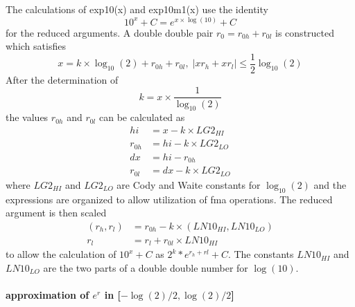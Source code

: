 \documentclass[10pt,a4paper,final,oneside]{article}
\numberwithin{equation}{subsection}
\begin{document}
The calculations of exp10(x) and exp10m1(x) use the
identity
\begin{equation}
  10^x + C = e^{x \times \log{(10)}} + C
\end{equation}
for the reduced arguments. A  double double pair $ r_0= r_{0h} + r_{0l} $ is constructed which satisfies
\begin{equation}
  x = k \times \log_{10}{(2)} + r_{0h} + r_{0l}, \;
  |xr_h +xr_l| \le \frac{1}{2} \log_{10}{(2)}
\end{equation}
After the determination of
\[
k = x \times \frac{1}{\log_{10}{(2)}}
\]
the values $r_{0h}$ and $r_{0l}$ can be calculated as
\[
\begin{aligned}
  hi &= x - k \times LG2_{HI} \\
  r_{0h} &= hi - k \times LG2_{LO} \\
  dx & = hi - r_{0h} \\
  r_{0l} &= dx - k \times LG2_{LO}
\end{aligned}
\]
where $LG2_{HI}$ and $LG2_{LO}$ are Cody and Waite constants for
$\log_{10}{(2)}$
and the expressions are organized to allow utilization of fma operations.
The reduced argument is then scaled
\[
\begin{aligned}
  (r_h, r_l) &= r_{0h} - k \times (LN10_{HI}, LN10_{LO}) \\
  r_l &= r_l + r_{0l} \times LN10_{HI}
\end{aligned}
\]
to allow the calculation of $ 10^x + C $ as $ 2^k * e^{r_h+ rl} + C$.
The constants $LN10_{HI}$ and $LN10_{LO}$ are the two parts of a
double double number for $\log(10)$.


\paragraph{approximation of $e^r$ in [$-\log(2)/2, \log(2)/2$]}
\end{document}
